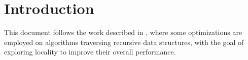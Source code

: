\section{Introduction}
\label{sec:intro}

This document follows the work described in \cite{tree_tiler}, where some optimizations are employed on algorithms traversing recursive data structures, with the goal of exploring locality to improve their overall performance.

